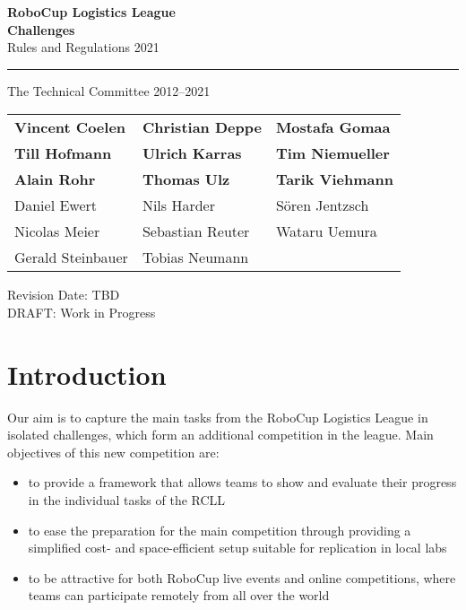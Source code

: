 \documentclass[12pt,twoside]{article}
\begin{document}
\begin{titlepage}
  \vspace*{5cm}
  \begin{center}
    \begin{LARGE}

      {\bf RoboCup Logistics League}\\[2ex]
			{\Large \bf{Challenges}}\\[4ex]
      {\Large Rules and Regulations 2021}\\[4ex]
    \end{LARGE}
    \hrule

    {\LARGE\vspace*{4ex}}
    \begin{Large}
      The Technical Committee 2012--2021\\[6ex]
    \end{Large}
    \begin{tabular}{lll}
      \textbf{Vincent Coelen}&\textbf{Christian Deppe}&\textbf{Mostafa Gomaa}\\
      \textbf{Till Hofmann}&\textbf{Ulrich Karras}&\textbf{Tim Niemueller}\\
			\textbf{Alain Rohr}&\textbf{Thomas Ulz}&\textbf{Tarik Viehmann}\\[.5em]

      Daniel Ewert&Nils Harder&S\"oren Jentzsch\\
      Nicolas Meier&Sebastian Reuter&Wataru Uemura\\
      Gerald Steinbauer&Tobias Neumann\\
    \end{tabular}
    \vfill
		Revision Date: \ac{TBD}\\
		DRAFT: Work in Progress %
  \end{center}
\end{titlepage}


\section{Introduction}
\label{sec:intro}
Our aim is to capture the main tasks from the RoboCup Logistics League in
isolated challenges, which form an additional competition in the league.
Main objectives of this new competition are:
\begin{itemize}
	\item to provide a framework that allows teams to show and evaluate their
		progress in the individual tasks of the RCLL
	\item to ease the preparation for the main competition through providing a
		simplified cost- and space-efficient setup suitable for replication in
		local labs
	\item to be attractive for both RoboCup live events and online competitions,
		where teams can participate remotely from all over the world
\end{itemize}
\end{document}

